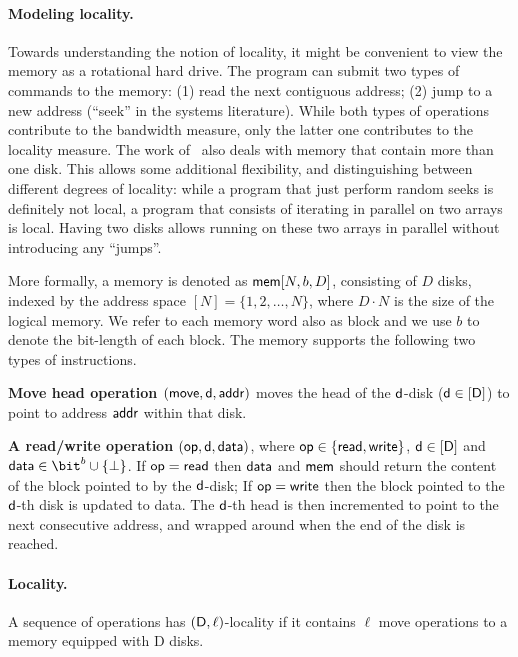 \paragraph{Modeling locality.}
Towards understanding the notion of locality, it might be convenient to view the memory as a rotational hard drive. The program can submit two types of commands to the memory: (1) read the next contiguous address; (2) jump to a new address (``seek'' in the systems literature). While both types of operations contribute to the bandwidth measure, only the latter one contributes to the locality measure. The work of~\cite{AsharovCNPRS19} also deals with memory that contain more than one disk. This allows some additional flexibility, and distinguishing between different degrees of locality: while a program that just perform random seeks is definitely not local, a program that consists of iterating in parallel on two arrays is local. Having two disks allows running on these two arrays in parallel without introducing any ``jumps''. 

More formally, a memory is denoted as ${\mathsf{mem}}[N,b, D]$, consisting of $D$ disks, indexed by the address space $[N]= \{1,2,\ldots,N\}$, where $D \cdot N$ is the size of the logical memory. We refer to each memory word also as block and we use $b$ to denote the bit-length of each block. The memory supports the following two types of instructions.
\begin{MyItemize}
\item {\bf Move head operation $({\sf move},{\sf d},{\sf addr})$} moves the head of the ${\sf d}$-disk (${\sf d} \in [{\sf D}]$) to point to address ${\sf addr}$ within that disk.
\item {\bf A read/write operation $({\sf op},{\sf d},{\sf data})$}, where ${\sf op} \in \{{\mathsf{read}},{\mathsf{write}}\}$, ${\sf d} \in [{\sf D}]$ and ${\sf data} \in \bit^{b} \cup \{\bot\}$. If ${\sf op} = {\mathsf{read}}$ then ${\sf data}$ and ${\mathsf{mem}}$ should return the content of the block pointed to by the ${\sf d}$-disk; If ${\sf op} = {\mathsf{write}}$ then the block pointed to the ${\sf d}$-th disk is updated to {\sf data}. The ${\sf d}$-th head is then incremented to point to the next consecutive address, and wrapped around when the end of the disk is reached. 
\end{MyItemize}

\paragraph{Locality.}
A sequence of operations has $({\sf D},\ell)$-locality if it contains $\ell$ {\sf move} operations to a memory equipped with {\sf D} disks. 

